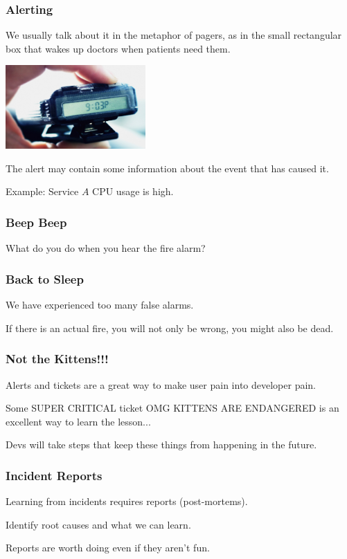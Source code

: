 \begin{frame}
\frametitle{Alerting}

 We usually talk about it in the metaphor of pagers, as in the small rectangular box that wakes up doctors when patients need them.
 
 \begin{center}
	\includegraphics[width=0.4\textwidth]{images/pager.jpg}
\end{center}

The alert may contain some information about the event that has caused it.

Example: Service $A$ CPU usage is high.

\end{frame}


\begin{frame}
\frametitle{Beep Beep}

\large

What do you do when you hear the fire alarm?

\end{frame}


\begin{frame}
\frametitle{Back to Sleep}

We have experienced too many false alarms.


If there is an actual fire, you will not only be wrong, you might also be dead.
\end{frame}


\begin{frame}
\frametitle{Not the Kittens!!!}

Alerts and tickets are a great way to make user pain into developer pain.

Some SUPER CRITICAL ticket OMG KITTENS ARE ENDANGERED is an excellent way to learn the lesson... 

Devs will take steps that keep these things from happening in the future.
\end{frame}


\begin{frame}
\frametitle{Incident Reports}

Learning from incidents requires reports (post-mortems).

Identify root causes and what we can learn. 

Reports are worth doing even if they aren't fun.

\end{frame}


